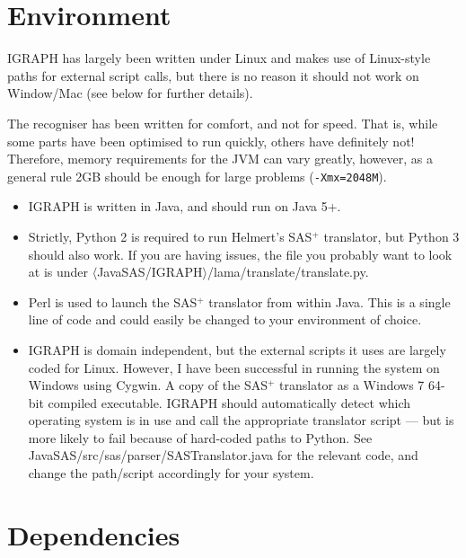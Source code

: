 \documentclass[10pt,a4paper]{article}
\begin{document}
\section{Environment}

\textsc{IGRAPH} has largely been written under Linux and makes use of Linux-style paths for external script calls, but there is no reason it should not work on Window/Mac (see below for further details).

The recogniser has been written for comfort, and not for speed. That is, while some parts have been optimised to run quickly, others have definitely not! Therefore, memory requirements for the JVM can vary greatly, however, as a general rule 2GB should be enough for large problems (\texttt{-Xmx=2048M}).

\begin{itemize}

\item \textsc{IGRAPH} is written in Java, and should run on Java 5+.

\item Strictly, Python 2 is required to run Helmert's SAS$^+$ translator, but Python 3 should also work. If you are having issues, the file you probably want to look at is under $\langle$JavaSAS/IGRAPH$\rangle$/lama/translate/translate.py.

\item Perl is used to launch the SAS$^+$ translator from within Java. This is a single line of code and could easily be changed to your environment of choice.

\item \textsc{IGRAPH} is domain independent, but the external scripts it uses are largely coded for Linux. However, I have been successful in running the system on Windows using Cygwin. A copy of the SAS$^+$ translator as a Windows 7 64-bit compiled executable. \textsc{IGRAPH} should automatically detect which operating system is in use and call the appropriate translator script --- but is more likely to fail because of hard-coded paths to Python. See JavaSAS/src/sas/parser/SASTranslator.java for the relevant code, and change the path/script accordingly for your system.

\end{itemize}


\section{Dependencies}
\end{document}
